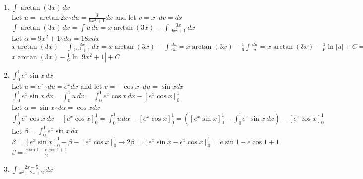 \documentclass[10pt, letterpaper]{report}
\begin{document}
\begin{enumerate}
  \item{$\int{\arctan{(3x)}}\,dx$} \\

    Let $u=\arctan{2x}\therefore du=\frac{3}{9x^{2}+1}dx$ and let $v=x\therefore dv=dx$ \\

    $\int{\arctan{(3x)}}\,dx=\int{u}\,dv=x\arctan{(3x)}-\int{\frac{3x}{9x^{2}+1}}\,dx$ \\

    Let $\alpha=9x^2+1\therefore d\alpha=18xdx$ \\

    $x\arctan{(3x)}-\int{\frac{3x}{9x^{2}+1}}\,dx=x\arctan{(3x)}-\int{\frac{du}{6u}}=
    x\arctan{(3x)}-\frac{1}{6}\int{\frac{du}{u}}=x\arctan{(3x)}-\frac{1}{6}\ln{|u|}+C=$ \\

    $x\arctan{(3x)}-\frac{1}{6}\ln{|9x^2+1|}+C$ \\

  \item{$\int_{0}^{1}{e^{x}\sin{x}}\,dx$} \\

    Let $u=e^{x}\therefore du=e^{x}dx$ and let $v=-\cos{x}\therefore du=\sin{x}dx$ \\

    $\int_{0}^{1}{e^{x}\sin{x}}\,dx=\int_{0}^{1}{u}\,dv=
    \int_{0}^{1}{e^{x}\cos{x}}\,dx-[e^{x}\cos{x}]_{0}^{1}$ \\

    Let $\alpha=\sin{x}\therefore d\alpha=\cos{x}dx$ \\

    $\int_{0}^{1}{e^{x}\cos{x}}\,dx-[e^{x}\cos{x}]_{0}^{1}=
    \int_{0}^{1}{u}\,d\alpha-[e^{x}\cos{x}]_{0}^{1}=
    \left([e^{x}\sin{x}]_{0}^{1}-\int_{0}^{1}{e^{x}\sin{x}}\,dx\right)-[e^{x}\cos{x}]_{0}^{1}$ \\

    Let $\beta=\int_{0}^{1}{e^{x}\sin{x}}\,dx$ \\

    $\beta=[e^{x}\sin{x}]_{0}^{1}-\beta-[e^{x}\cos{x}]_{0}^{1} \rightarrow 2\beta=[e^{x}\sin{x}-e^{x}\cos{x}]_{0}^{1}=e\sin{1}-e\cos{1}+1$ \\

    $\beta=\frac{e\sin{1}-e\cos{1}+1}{2}$ \\
    \pagebreak

  \item{$\int{\frac{2x-5}{x^{2}+2x+2}}\,dx$} \\


\end{enumerate}
\end{document}
